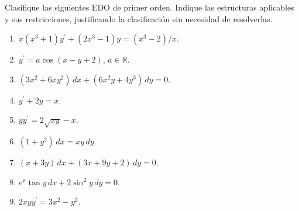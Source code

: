 Clasifique las siguientes EDO de primer orden. Indique las estructuras aplicables y sus restricciones, justificando la clasificación sin necesidad de resolverlas.

\begin{enumerate}[label=(\alph*),ref=\alph*,leftmargin=*]
\item $x(x^3+1)y^{\prime}+(2x^3-1)y=(x^3-2)/x$.
\item $y^{\prime}=a\cos(x-y+2)$, $a\in\mathbb R$.
\item $(3x^2+6xy^2)\,dx+(6x^2y+4y^3)\,dy=0$.
\item $y^{\prime}+2y=x$.
\item $yy^{\prime}=2\sqrt{xy}-x$.
\item $(1+y^2)\,dx=xy\,dy$.
\item $(x+3y)\,dx+(3x+9y+2)\,dy=0$.
\item $e^x\tan y\,dx+2\sin^2y\,dy=0$.
\item $2xyy^{\prime}=3x^2-y^2$.
\end{enumerate}
